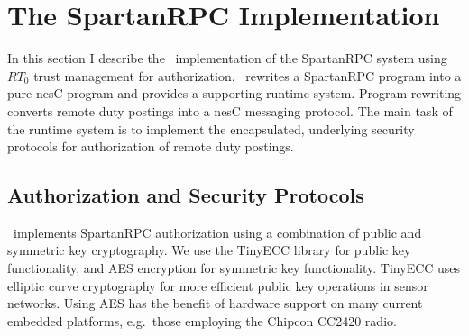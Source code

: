 \begin{comment}
In order to invoke this service the wiring as shown in \autoref{figure-secure-wire} could be
made on the client side. Note the activation of the necessary credentials, as well as the
specification of client identity as \code{NetB}.

\begin{figure}[!t]
\begin{textbox}{3.0in}
\begin{Verbatim}[fontsize=\small]
enable
  "WSNAdmin.control <- NetB.control, 
    NetB.control    <- NetB" as "NetB"
for 
  ClientC.SamplingRate -> [RemoteSelectorC];
\end{Verbatim}
\end{textbox}
\caption{Security Enabled Dynamic Wire}
\label{figure-secure-wire}
\end{figure}

\end{comment}

\section{The SpartanRPC Implementation}
\label{section-implementation}

In this section I describe the \Sprocket\ implementation of the SpartanRPC system using $RT_0$
trust management for authorization. \Sprocket\ rewrites a SpartanRPC program into a pure nesC
program and provides a supporting runtime system. Program rewriting converts remote duty
postings into a nesC messaging protocol. The main task of the runtime system is to implement the
encapsulated, underlying security protocols for authorization of remote duty postings.

\subsection{Authorization and Security Protocols}
\label{section-security-protocols}
\label{section-underlying-protocols}

\Sprocket\ implements SpartanRPC authorization using a combination of public and symmetric key
cryptography. We use the TinyECC library \cite{Liu-Peng-TinyECC-2008} for public key
functionality, and AES encryption for symmetric key functionality. TinyECC uses elliptic curve
cryptography for more efficient public key operations in sensor networks. Using AES has the
benefit of hardware support on many current embedded platforms, e.g.~those employing the Chipcon
CC2420 radio.

